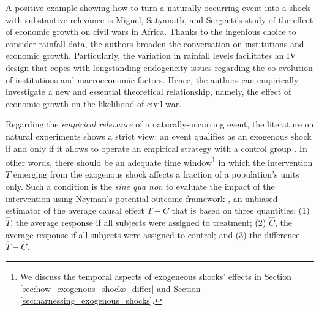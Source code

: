 \documentclass[11pt]{article}
\begin{document}
\begin{refsection}
A positive example showing how to turn a naturally-occurring event into a shock
with substantive relevance is Miguel, Satyanath, and Sergenti's
\autocite*{miguel_et_al_2004} study of the effect of economic growth on civil
wars in Africa. Thanks to the ingenious choice to consider rainfall data, the
authors broaden the conversation on institutions and economic growth.
Particularly, the variation in rainfall levels facilitates an IV design that  
copes with longstanding endogeneity issues regarding the co-evolution of
institutions and macroeconomic factors. Hence, the authors can empirically
investigate a new and essential theoretical relationship, namely, the effect of
economic growth on the likelihood of civil war. 

Regarding the \textit{empirical relevance} of a naturally-occurring event, the
literature on natural experiments shows a strict view: an event qualifies as an
exogenous shock if and only if it allows to operate an empirical strategy with a
control group \autocite[][]{cook_et_al_2002}. In other words, there should be an
adequate time window\footnote{We discuss the temporal aspects of exogeneous
shocks' effects in Section \ref{sec:how_exogenous_shocks_differ} and Section
\ref{sec:harnessing_exogenous_shocks}.} in which the intervention $T$ emerging
from the exogenous shock affects a fraction of a population's units only.  Such
a condition is the \textit{sine qua non} to evaluate the impact of the
intervention using Neyman's potential outcome framework
\autocite*{neyman_et_al_1923}, an unbiased estimator of the average causal
effect $T - C$ that is based on three quantities: (1) $\widehat{T}$, the average
response if all subjects were assigned to treatment; (2) $\widehat{C}$, the
average response if all subjects were assigned to control; and (3) the
difference $\hat{T} - \widehat{C}$.


\end{refsection}
\end{document}
